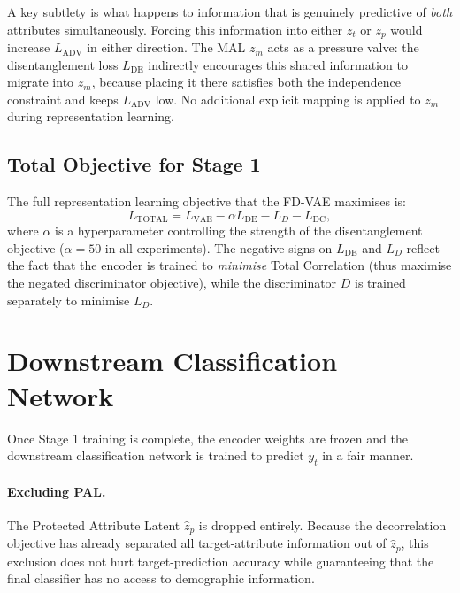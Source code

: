 A key subtlety is what happens to information that is genuinely predictive of \emph{both} attributes
simultaneously. Forcing this information into either $z_t$ or $z_p$ would increase $L_\text{ADV}$ in
either direction. The MAL $z_m$ acts as a pressure valve: the disentanglement loss $L_\text{DE}$
indirectly encourages this shared information to migrate into $z_m$, because placing it there
satisfies both the independence constraint and keeps $L_\text{ADV}$ low. No additional explicit
mapping is applied to $z_m$ during representation learning.

\subsection{Total Objective for Stage 1}

The full representation learning objective that the FD-VAE maximises is:
\begin{equation}
    L_\text{TOTAL} = L_\text{VAE} - \alpha L_\text{DE} - L_D - L_\text{DC},
    \label{eq:total}
\end{equation}
where $\alpha$ is a hyperparameter controlling the strength of the disentanglement
objective ($\alpha = 50$ in all experiments). The negative signs on $L_\text{DE}$ and $L_D$ reflect
the fact that the encoder is trained to \emph{minimise} Total Correlation (thus maximise the negated
discriminator objective), while the discriminator $D$ is trained separately to minimise $L_D$.

\section{Downstream Classification Network}
\label{sec:readme-downstream}

Once Stage 1 training is complete, the encoder weights are frozen and the downstream classification
network is trained to predict $y_t$ in a fair manner.

\paragraph{Excluding PAL.}
The Protected Attribute Latent $\hat{z}_p$ is dropped entirely. Because the decorrelation objective
has already separated all target-attribute information out of $\hat{z}_p$, this exclusion does not
hurt target-prediction accuracy while guaranteeing that the final classifier has no access to
demographic information.

